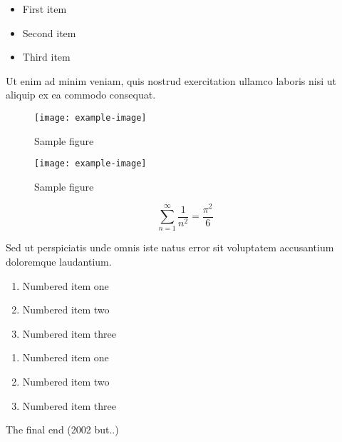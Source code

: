 \documentclass{article}
\begin{document}
\begin{itemize}
\item First item
\item Second item
\item Third item
\end{itemize}

Ut enim ad minim veniam, quis nostrud exercitation ullamco laboris nisi ut aliquip ex ea commodo consequat.


\begin{figure}[h]
    \centering
    \texttt{[image: example-image]}
    \caption{Sample figure}
    \label{fig:sample}
\end{figure}

\begin{figure}[h]
    \centering
    \texttt{[image: example-image]}
    \caption{Sample figure}
    \label{fig:sample}
\end{figure}


\begin{equation}
    \sum_{n=1}^{\infty} \frac{1}{n^2} = \frac{\pi^2}{6}
\end{equation}

Sed ut perspiciatis unde omnis iste natus error sit voluptatem accusantium doloremque laudantium.

\begin{enumerate}
\item Numbered item one
\item Numbered item two
\item Numbered item three
\end{enumerate}

\begin{enumerate}
\item Numbered item one
\item Numbered item two
\item Numbered item three
\end{enumerate}

The final end (2002 but..)

\end{document}
